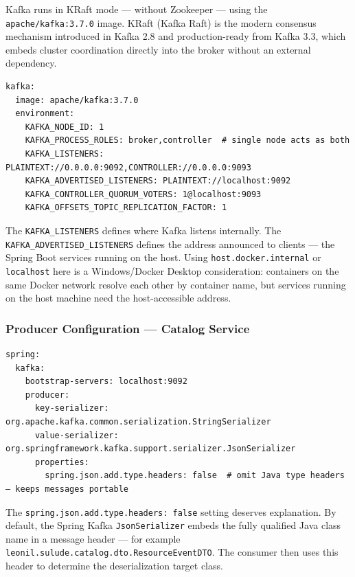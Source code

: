Kafka runs in KRaft mode --- without Zookeeper --- using the \texttt{apache/kafka:3.7.0} image. KRaft (Kafka Raft) is the modern consensus mechanism introduced in Kafka 2.8 and production-ready from Kafka 3.3, which embeds cluster coordination directly into the broker without an external dependency.

\begin{lstlisting}[style=yamlstyle, caption={Kafka KRaft configuration in docker-compose.yaml}]
kafka:
  image: apache/kafka:3.7.0
  environment:
    KAFKA_NODE_ID: 1
    KAFKA_PROCESS_ROLES: broker,controller  # single node acts as both
    KAFKA_LISTENERS: PLAINTEXT://0.0.0.0:9092,CONTROLLER://0.0.0.0:9093
    KAFKA_ADVERTISED_LISTENERS: PLAINTEXT://localhost:9092
    KAFKA_CONTROLLER_QUORUM_VOTERS: 1@localhost:9093
    KAFKA_OFFSETS_TOPIC_REPLICATION_FACTOR: 1
\end{lstlisting}

The \texttt{KAFKA\_LISTENERS} defines where Kafka listens internally. The \texttt{KAFKA\_ADVERTISED\_LISTENERS} defines the address announced to clients --- the Spring Boot services running on the host. Using \texttt{host.docker.internal} or \texttt{localhost} here is a Windows/Docker Desktop consideration: containers on the same Docker network resolve each other by container name, but services running on the host machine need the host-accessible address.

\subsubsection{Producer Configuration --- Catalog Service}

\begin{lstlisting}[style=yamlstyle, caption={Kafka producer configuration in catalog-service application.yaml}]
spring:
  kafka:
    bootstrap-servers: localhost:9092
    producer:
      key-serializer: org.apache.kafka.common.serialization.StringSerializer
      value-serializer: org.springframework.kafka.support.serializer.JsonSerializer
      properties:
        spring.json.add.type.headers: false  # omit Java type headers — keeps messages portable
\end{lstlisting}

The \texttt{spring.json.add.type.headers: false} setting deserves explanation. By default, the Spring Kafka \texttt{JsonSerializer} embeds the fully qualified Java class name in a message header --- for example \texttt{leonil.sulude.catalog.dto.ResourceEventDTO}. The consumer then uses this header to determine the deserialization target class.

